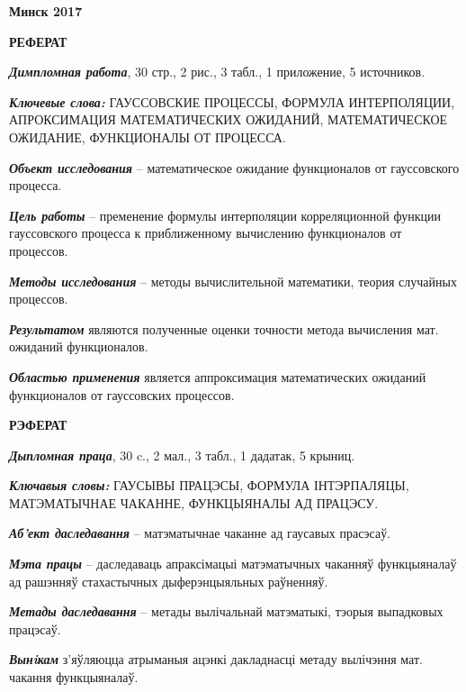 \documentclass [a4paper, 12pt]{report}
\begin{document}
\bigskip
\bigskip
\bigskip
\bigskip
\begin{center}
	\bf{Минск 2017}
\end{center}

\newpage

\begin{center}
	\textbf{РЕФЕРАТ}
\end{center}

\emph{\textbf{Димпломная работа}}, 30 стр., 2 рис., 3 табл., 1 приложение, 5 источников.

\emph{\textbf{Ключевые слова:}} ГАУССОВСКИЕ ПРОЦЕССЫ, ФОРМУЛА ИНТЕРПОЛЯЦИИ, АПРОКСИМАЦИЯ МАТЕМАТИЧЕСКИХ ОЖИДАНИЙ, МАТЕМАТИЧЕСКОЕ ОЖИДАНИЕ, ФУНКЦИОНАЛЫ ОТ ПРОЦЕССА.

\emph{\textbf{Объект исследования}} -- математическое ожидание функционалов от гауссовского процесса.

\emph{\textbf{Цель работы}} -- пременение формулы интерполяции корреляционной функции гауссовского процесса к приближенному вычислению функционалов от процессов.

\emph{\textbf{Методы исследования}} -- методы вычислительной математики, теория случайных процессов.

\emph{\textbf{Результатом}} являются полученные оценки точности метода вычисления мат. ожиданий функционалов.

\emph{\textbf{Областью применения}} является аппроксимация математических ожиданий функционалов от гауссовских процессов.


\newpage

\begin{center}
	\textbf{РЭФЕРАТ}
\end{center}

\emph{\textbf{Дыпломная праца}}, 30 c., 2 мал., 3 табл., 1 дадатак, 5 крыниц.

\emph{\textbf{Ключавыя словы:}}
ГАУСЫВЫ ПРАЦЭСЫ, ФОРМУЛА ІНТЭРПАЛЯЦЫ, МАТЭМАТЫЧНАЕ ЧАКАННЕ, ФУНКЦЫЯНАЛЫ АД ПРАЦЭСУ.

\emph{\textbf{Аб'ект даследавання}} -- матэматычнае чаканне ад гаусавых прасэсаў.

\emph{\textbf{Мэта працы}} -- даследаваць апраксімацыі матэматычных чаканняў функцыяналаў ад рашэнняў стахастычных дыферэнцыяльных раўненняў.

\emph{\textbf{Метады даследавання}} -- метады вылічальнай матэматыкі, тэорыя выпадковых працэсаў.

\emph{\textbf{Вынiкам}} з'яўляюцца атрыманыя ацэнкі дакладнасці метаду вылічэння мат. чакання функцыяналаў.
\end{document}
